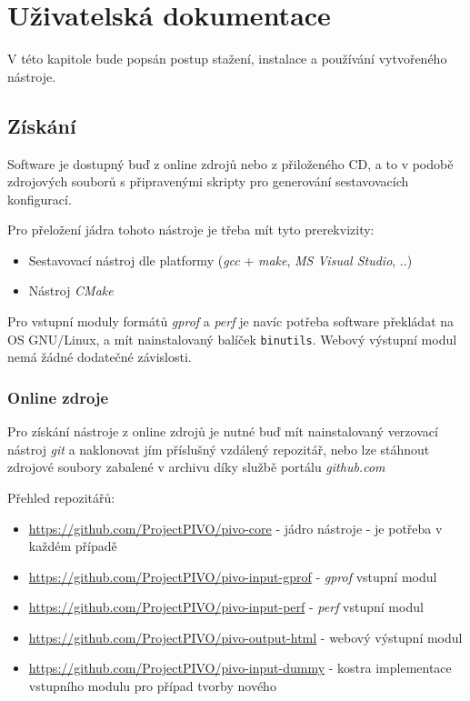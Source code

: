 \documentclass[czech,BP]{thesiskiv}
\begin{document}
\chapter{Uživatelská dokumentace}

V této kapitole bude popsán postup stažení, instalace a používání vytvořeného nástroje.

\section{Získání}

Software je dostupný buď z online zdrojů nebo z přiloženého CD, a to v podobě zdrojových souborů s připravenými skripty pro generování sestavovacích konfigurací.

Pro přeložení jádra tohoto nástroje je třeba mít tyto prerekvizity:

\begin{itemize}
\item Sestavovací nástroj dle platformy (\emph{gcc} + \emph{make}, \emph{MS Visual Studio}, ..)
\item Nástroj \emph{CMake}
\end{itemize}

Pro vstupní moduly formátů \emph{gprof} a \emph{perf} je navíc potřeba software překládat na OS GNU/Linux, a mít nainstalovaný balíček \texttt{binutils}. Webový výstupní modul nemá žádné dodatečné závislosti.

\subsection*{Online zdroje}

Pro získání nástroje z online zdrojů je nutné buď mít nainstalovaný verzovací nástroj \emph{git} a naklonovat jím příslušný vzdálený repozitář, nebo lze stáhnout zdrojové soubory zabalené v archivu díky službě portálu \emph{github.com}

Přehled repozitářů:
\begin{itemize}
\item \url{https://github.com/ProjectPIVO/pivo-core} - jádro nástroje - je potřeba v každém případě
\item \url{https://github.com/ProjectPIVO/pivo-input-gprof} - \emph{gprof} vstupní modul
\item \url{https://github.com/ProjectPIVO/pivo-input-perf} - \emph{perf} vstupní modul
\item \url{https://github.com/ProjectPIVO/pivo-output-html} - webový výstupní modul
\item \url{https://github.com/ProjectPIVO/pivo-input-dummy} - kostra implementace vstupního modulu pro případ tvorby nového
\end{itemize}
\end{document}
